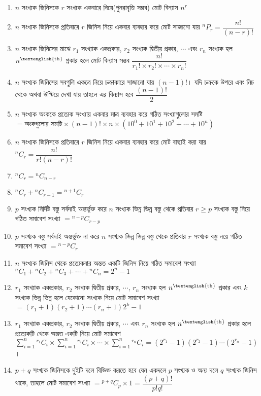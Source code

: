 \documentclass[a4paper,12pt]{article}
\newcommand{\tm}{\item}
\newcommand{\eng}{\textenglish}
\newcommand*{\perm}[2]{{}^{#1}\!P_{#2}}%
\newcommand*{\comb}[2]{{}^{#1}C_{#2}}%
\begin{document}
\begin{enumerate}[ wide=0em, label=\textenglish{\textbf{ \arabic* .}}, itemsep=0pt, parsep=1ex]

    \tm $n$ সংখ্যক জিনিসকে $r$ সংখ্যক একবারে নিয়ে(পুনরাবৃত্তি সম্ভব) মোট বিন্যাস $n^r$

    \tm $n$ সংখ্যক জিনিসকে প্রতিবারে $r$ জিনিস নিয়ে একবার ব্যবহার করে মোট সাজানো যায় $\perm{n}{r}=\dfrac{n!}{(n-r)!}$ 

    \tm $n$ সংখ্যক জিনিসের মাঝে $r_1$ সংখ্যাক একপ্রকার, $r_2$ সংখ্যক দ্বিতীয় প্রকার, $\cdots$ এবং $r_n$ সংখ্যক হল $n^{\text{\eng{th}}}$ প্রকার হলে মোট বিন্যাস সম্ভব $\dfrac{n!}{r_1!\times r_2! \times \cdots \times r_n!}$

    \tm $n$ সংখ্যক জিনিসের সবগুলি একত্রে নিয়ে চক্রাকারে সাজানো যায় $(n-1)!$। যদি চক্রকে উপরে এবং নিচ থেকে অথবা উল্টিয়ে দেখা যায় তাহলে এর বিন্যাস হবে $\dfrac{(n-1)!}{2}$
    
    \tm $n$ সংখ্যক অংককে প্রত্যেক সংখ্যায় একবার মাত্র ব্যবহার করে গঠিত সংখ্যাগুলোর সমষ্টি $=\text{অংকগুলোর সমষ্টি}\times (n-1)! \times n \times (10^0+10^1+10^2+ \cdots + 10^n)$

    \tm $n$ সংখ্যক জিনিসকে প্রতিবারে $r$ জিনিস নিয়ে একবার ব্যবহার করে মোট বাছাই করা যায় $\comb{n}{r}=\dfrac{n!}{r!(n-r)!}$ 

    \tm $\comb{n}{r}=\comb{n}{n-r}$

    \tm $\comb{n}{r}+\comb{n}{r-1}=\comb{n+1}{r}$

    \tm $p$ সংখ্যক নির্দিষ্ট বস্তু সর্বদাই অন্তর্ভুক্ত করে $n$ সংখ্যক ভিন্ন ভিন্ন বস্তু থেকে প্রতিবার $r \ge p$ সংখ্যক বস্তু নিয়ে গঠিত সমাবেশ সংখ্যা $=\comb{n-p}{r-p}$ 

    \tm $p$ সংখ্যক বস্তু সর্বদাই অন্তর্ভুক্ত না করে $n$ সংখ্যক ভিন্ন ভিন্ন বস্তু থেকে প্রতিবার $r$ সংখ্যক বস্তু নয়ে গঠিত সমাবেশ সংখ্যা $=\comb{n-p}{r}$

    \tm $n$ সংখ্যক জিনিস থেকে প্রত্যেকবার অন্তত একটি জিনিস নিয়ে গঠিত সমাবেশ সংখ্যা $\comb{n}{1}+\comb{n}{2}+\comb{n}{3}+\cdots+ \comb{n}{n}=2^n-1$

    \tm $r_1$ সংখ্যাক একপ্রকার, $r_2$ সংখ্যক দ্বিতীয় প্রকার, $\cdots$, $r_n$ সংখ্যক হল $n^{\text{\eng{th}}}$ প্রকার এবং $k$ সংখ্যক ভিন্ন ভিন্ন হলে যেকোনো সংখ্যক নিয়ে মোট সমাবেশ সংখ্যা $=(r_1+1)(r_2+1)\cdots (r_n+1) 2^k-1$ 

    \tm $r_1$ সংখ্যাক একপ্রকার, $r_2$ সংখ্যক দ্বিতীয় প্রকার, $\cdots$ এবং $r_n$ সংখ্যক হল $n^{\text{\eng{th}}}$ প্রকার হলে প্রত্যেকটি থেকে অন্তত একটি নিয়ে মোট সমাবেশ $\displaystyle \sum_{i=1}^{n} \comb{r_1}{i} \times \sum_{i=1}^{n} \comb{r_2}{i} \times \cdots \times \sum_{i=1}^{n} \comb{r_n}{i}=(2^{r_1}-1)(2^{r_2}-1)\cdots(2^{r_n}-1)$। 

    \tm $p+q$ সংখ্যক জিনিসকে দুইটি দলে বিভিক্ত করতে হবে যেন একদলে $p$ সংখ্যক ও অন্য দলে $q$ সংখ্যক জিনিস থাকে, তাহলে মোট সমাবেশ সংখ্যা $= \comb{p+q}{p}\times 1=\dfrac{(p+q)!}{p!q!}$

\end{enumerate}
\end{document}
